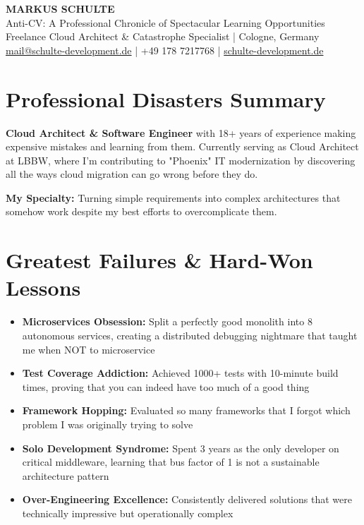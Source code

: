 \documentclass[10pt,a4paper]{article}
\begin{document}
\begin{center}
{\LARGE\bfseries\color{failred} MARKUS SCHULTE}\\[0.2em]
{\large\color{lessongray} Anti-CV: A Professional Chronicle of Spectacular Learning Opportunities}\\[0.5em]
{\footnotesize Freelance Cloud Architect \& Catastrophe Specialist | Cologne, Germany}\\
{\footnotesize \href{mailto:mail@schulte-development.de}{mail@schulte-development.de} | +49 178 7217768 | \href{https://schulte-development.de}{schulte-development.de}}
\end{center}

\section*{Professional Disasters Summary}

\textbf{Cloud Architect \& Software Engineer} with 18+ years of experience making expensive mistakes and learning from them. Currently serving as Cloud Architect at LBBW, where I'm contributing to "Phoenix" IT modernization by discovering all the ways cloud migration can go wrong before they do.

\textbf{My Specialty:} Turning simple requirements into complex architectures that somehow work despite my best efforts to overcomplicate them.

\section*{Greatest Failures \& Hard-Won Lessons}

\begin{itemize}[leftmargin=1em,topsep=0pt,itemsep=0pt]
\item \textbf{Microservices Obsession:} Split a perfectly good monolith into 8 autonomous services, creating a distributed debugging nightmare that taught me when NOT to microservice
\item \textbf{Test Coverage Addiction:} Achieved 1000+ tests with 10-minute build times, proving that you can indeed have too much of a good thing
\item \textbf{Framework Hopping:} Evaluated so many frameworks that I forgot which problem I was originally trying to solve
\item \textbf{Solo Development Syndrome:} Spent 3 years as the only developer on critical middleware, learning that bus factor of 1 is not a sustainable architecture pattern
\item \textbf{Over-Engineering Excellence:} Consistently delivered solutions that were technically impressive but operationally complex
\end{itemize}
\end{document}
